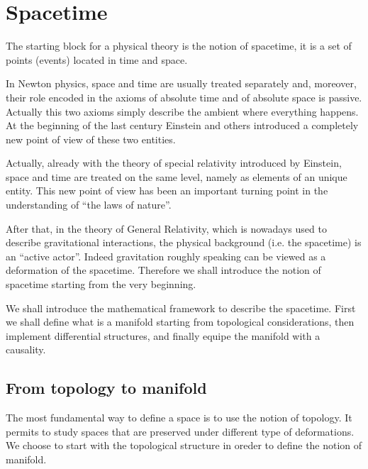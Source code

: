 \documentclass[11pt]{book}
\theoremstyle{break}
\begin{document}
\chapter{Spacetime}
\label{p:SPACETIME}



The starting block for a physical theory is the notion of spacetime, it is a set of points (events) located in time and space. 


In Newton physics, space and time are usually treated separately and, moreover, their role encoded in the axioms of absolute time and of absolute space is passive. Actually this two axioms simply describe the ambient where everything happens. At the beginning of the last century Einstein and others introduced a completely new point of view of these two entities.


Actually, already with the theory of special relativity introduced by Einstein, space and time are treated on the same level, namely as elements of an unique entity. This new point of view has been an important turning point in the understanding of ``the laws of nature''.


After that, in the theory of General Relativity, which is nowadays used to describe gravitational interactions, the physical background (i.e. the spacetime) is an ``active actor''. Indeed gravitation roughly speaking can be viewed as a deformation of the spacetime. Therefore we shall introduce the notion of spacetime starting from the very beginning.


We shall introduce the mathematical framework to describe the spacetime. First we shall define what is a manifold starting from topological considerations, then implement differential structures, and finally equipe the manifold with a causality.


\section{From topology to manifold}


The most fundamental way to define a space is to use the notion of topology. It permits to study spaces that are preserved under different type of deformations. We choose to start with the topological structure in oreder to define the notion of manifold.
\end{document}
